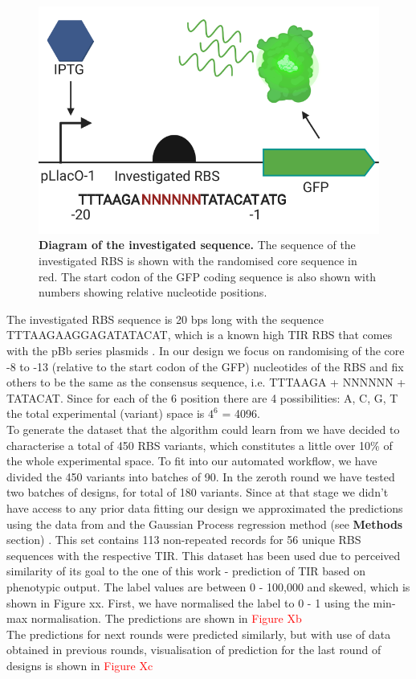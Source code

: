 \documentclass{article}
\begin{document}
\begin{figure}[h]
    \centering
    \includegraphics[scale=0.6]{plots/RBS_anatomy.pdf}
    \caption{\textbf{Diagram of the investigated sequence.} The sequence of the investigated RBS is shown with the randomised core sequence in red. The start codon of the GFP coding sequence is also shown with numbers showing relative nucleotide positions.}
    \label{fig:Anatomy}
\end{figure}


The investigated RBS sequence is 20 bps long with the sequence TTTAAGAAGGAGATATACAT, which is a known high TIR RBS that comes with the pBb series plasmids \cite{Lee2011}. 
In our design we focus on randomising of the core -8 to -13 (relative to the start codon of the GFP) nucleotides of the RBS and fix others to be the same as the consensus sequence, i.e. TTTAAGA + NNNNNN + TATACAT.
Since for each of the 6 position there are 4 possibilities: A, C, G, T the total experimental (variant) space is $4^6$ = 4096.\\
To generate the dataset that the algorithm could learn from we have decided to characterise a total of 450 RBS variants, which constitutes a little over 10\% of the whole experimental space. 
To fit into our automated workflow, we have divided the 450 variants into batches of 90.
In the zeroth round we have tested two batches of designs, for total of 180 variants. 
Since at that stage we didn't have access to any prior data fitting our design we approximated the predictions using the data from \textcite{jervis2018machine} and the Gaussian Process regression method (see \textbf{Methods} section) \cite{srinivas2012information}.
This set contains 113 non-repeated records for 56 unique RBS sequences with the respective TIR.
This dataset has been used due to perceived similarity of its goal to the one of this work - prediction of TIR based on phenotypic output.
The label values are between 0 - 100,000 and skewed, which is shown in Figure xx. First, we have normalised the label to 0 - 1 using the min-max normalisation. 
The predictions are shown in \textcolor{red}{Figure Xb}\\
The predictions for next rounds were predicted similarly, but with use of data obtained in previous rounds, visualisation of prediction for the last round of designs is shown in \textcolor{red}{Figure Xc} \\
\end{document}
